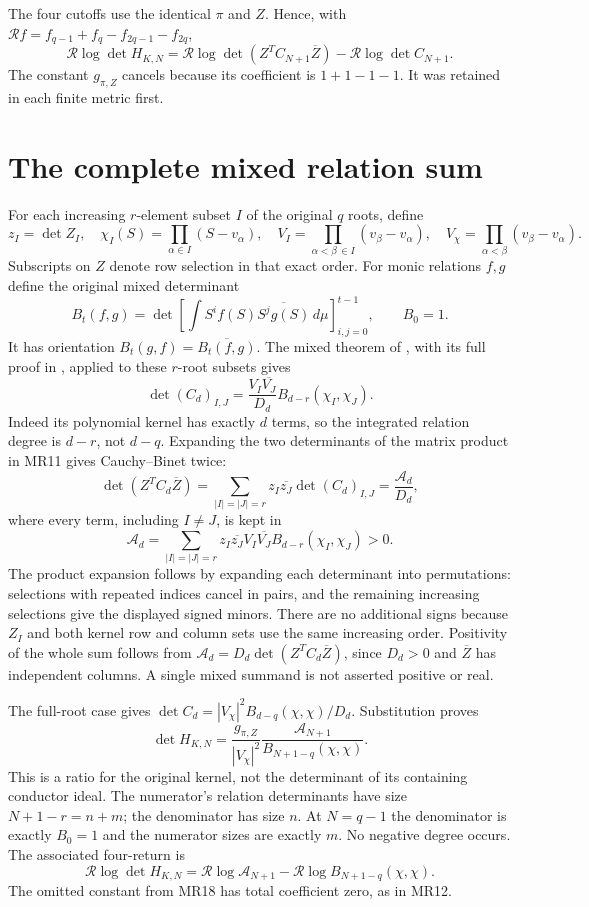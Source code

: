 The four cutoffs use the identical $\pi$ and $Z$. Hence, with
$\mathcal R f=f_{q-1}+f_q-f_{2q-1}-f_{2q}$,
\[
 \mathcal R\log\det H_{K,N}
 =\mathcal R\log\det(Z^TC_{N+1}\overline Z)
  -\mathcal R\log\det C_{N+1}.\tag{MR12}
\]
The constant $g_{\pi,Z}$ cancels because its coefficient is $1+1-1-1$.
It was retained in each finite metric first.

\section{The complete mixed relation sum}
For each increasing $r$-element subset $I$ of the original $q$ roots,
define
\[
 z_I=\det Z_I,\quad
 \chi_I(S)=\prod_{\alpha\in I}(S-v_\alpha),\quad
 V_I=\prod_{\alpha<\beta\,\in I}(v_\beta-v_\alpha),\quad
 V_\chi=\prod_{\alpha<\beta}(v_\beta-v_\alpha).\tag{MR13}
\]
Subscripts on $Z$ denote row selection in that exact order.
For monic relations $f,g$ define the original mixed determinant
\[
 B_t(f,g)=\det\left[\int S^if(S)
                    \overline{S^jg(S)}\,d\mu\right]_{i,j=0}^{t-1},
 \qquad B_0=1.\tag{MR14}
\]
It has orientation $B_t(g,f)=\overline{B_t(f,g)}$.
The mixed theorem of \cite{mrroot:AV}, with its full proof in \cite{mrroot:Mixed},
applied to these $r$-root subsets gives
\[
 \det(C_d)_{I,J}
  =\frac{V_I\overline{V_J}}{D_d}
           B_{d-r}(\chi_I,\chi_J).\tag{MR15}
\]
Indeed its polynomial kernel has exactly $d$ terms, so the integrated
relation degree is $d-r$, not $d-q$. Expanding the two determinants
of the matrix product in MR11 gives Cauchy--Binet twice:
\[
 \det(Z^TC_d\overline Z)
  =\sum_{|I|=|J|=r}z_I\overline{z_J}\det(C_d)_{I,J}
  =\frac{\mathcal A_d}{D_d},\tag{MR16}
\]
where every term, including $I\ne J$, is kept in
\[
 \mathcal A_d=
 \sum_{|I|=|J|=r}z_I\overline{z_J}V_I\overline{V_J}
                     B_{d-r}(\chi_I,\chi_J)>0.\tag{MR17}
\]
The product expansion follows by expanding each determinant into
permutations: selections with repeated indices cancel in pairs, and
the remaining increasing selections give the displayed signed minors.
There are no additional signs because $Z_I$ and both kernel row and
column sets use the same increasing order.
Positivity of the whole sum follows from
$\mathcal A_d=D_d\det(Z^TC_d\overline Z)$, since $D_d>0$ and
$\overline Z$ has independent columns. A single mixed summand is not
asserted positive or real.

The full-root case gives
$\det C_d=|V_\chi|^2 B_{d-q}(\chi,\chi)/D_d$. Substitution proves
\[
 \boxed{\det H_{K,N}
   =\frac{g_{\pi,Z}}{|V_\chi|^2}
      \frac{\mathcal A_{N+1}}{B_{N+1-q}(\chi,\chi)}.}
 \tag{MR18}
\]
This is a ratio for the original kernel, not the determinant of its
containing conductor ideal. The numerator's relation determinants
have size $N+1-r=n+m$; the denominator has size $n$. At $N=q-1$ the
denominator is exactly $B_0=1$ and the numerator sizes are exactly $m$.
No negative degree occurs. The associated four-return is
\[
 \boxed{\mathcal R\log\det H_{K,N}
   =\mathcal R\log\mathcal A_{N+1}
      -\mathcal R\log B_{N+1-q}(\chi,\chi).}\tag{MR19}
\]
The omitted constant from MR18 has total coefficient zero, as in MR12.

